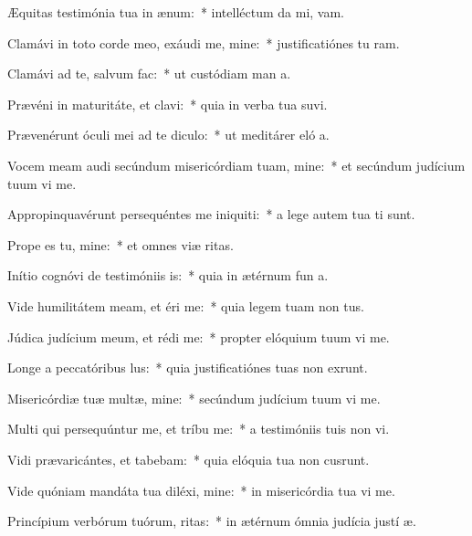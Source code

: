 \item Æquitas testimónia tua in ænum:~* intelléctum da mi,  vam.
\item Clamávi in toto corde meo, exáudi me, mine:~* justificatiónes tu ram.
\item Clamávi ad te, salvum  fac:~* ut custódiam man a.
\item Prævéni in maturitáte, et clavi:~* quia in verba tua suvi.
\item Prævenérunt óculi mei ad te diculo:~* ut meditárer eló a.
\item Vocem meam audi secúndum misericórdiam tuam, mine:~* et secúndum judícium tuum vi me.
\item Appropinquavérunt persequéntes me iniquiti:~* a lege autem tua  ti sunt.
\item Prope es tu, mine:~* et omnes viæ  ritas.
\item Inítio cognóvi de testimóniis is:~* quia in ætérnum fun a.
\item Vide humilitátem meam, et éri me:~* quia legem tuam non  tus.
\item Júdica judícium meum, et rédi me:~* propter elóquium tuum vi me.
\item Longe a peccatóribus lus:~* quia justificatiónes tuas non exrunt.
\item Misericórdiæ tuæ multæ, mine:~* secúndum judícium tuum vi me.
\item Multi qui persequúntur me, et tríbu me:~* a testimóniis tuis non vi.
\item Vidi prævaricántes, et tabebam:~* quia elóquia tua non cusrunt.
\item Vide quóniam mandáta tua diléxi, mine:~* in misericórdia tua vi me.
\item Princípium verbórum tuórum, ritas:~* in ætérnum ómnia judícia justí æ.
